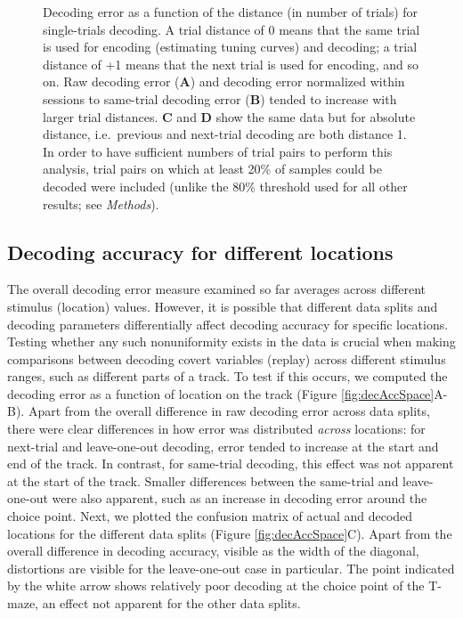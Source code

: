 \documentclass[11pt]{article}
\newcommand{\bsf}[1]{\textbf{#1}}
\begin{document}
\begin{figure}[h]
  \centering
  \caption{Decoding error as a function of the distance (in number of
    trials) for single-trials decoding. A trial distance of 0 means
    that the same trial is used for encoding (estimating tuning
    curves) and decoding; a trial distance of +1 means that the next
    trial is used for encoding, and so on. Raw decoding error
    (\bsf{A}) and decoding error normalized within sessions to
    same-trial decoding error (\bsf{B}) tended to increase with larger
    trial distances. \bsf{C} and \bsf{D} show the same data but for
    absolute distance, i.e.\ previous and next-trial decoding are both
    distance 1. In order to have sufficient numbers of trial pairs to
    perform this analysis, trial pairs on which at least 20\% of
    samples could be decoded were included (unlike the 80\% threshold
    used for all other results; see {\it Methods}).}
  \label{fig:decAccSingleLap}
\end{figure}

\subsection*{Decoding accuracy for different locations}

The overall decoding error measure examined so far averages across
different stimulus (location) values. However, it is possible that
different data splits and decoding parameters differentially affect
decoding accuracy for specific locations. Testing whether any such
nonuniformity exists in the data is crucial when making comparisons
between decoding covert variables (replay) across different stimulus
ranges, such as different parts of a track. To test if this occurs, we
computed the decoding error as a function of location on the track
(Figure \ref{fig:decAccSpace}A-B). Apart from the overall difference
in raw decoding error across data splits, there were clear differences
in how error was distributed {\it across} locations: for next-trial
and leave-one-out decoding, error tended to increase at the start and
end of the track. In contrast, for same-trial decoding, this effect
was not apparent at the start of the track. Smaller differences
between the same-trial and leave-one-out were also apparent, such as
an increase in decoding error around the choice point. Next, we
plotted the confusion matrix of actual and decoded locations for the
different data splits (Figure \ref{fig:decAccSpace}C). Apart from the
overall difference in decoding accuracy, visible as the width of the
diagonal, distortions are visible for the leave-one-out case in
particular. The point indicated by the white arrow shows relatively
poor decoding at the choice point of the T-maze, an effect not
apparent for the other data splits.
\end{document}
